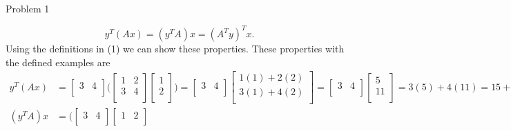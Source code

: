 \begin{problem}{Problem 1}
\begin{highlight}[Solution]
        \begin{equation}
            y^{T}(Ax) = (y^{T}A)x = (A^{T}y)^{T}x.
        \end{equation}
        Using the definitions in (1) we can show these properties. These properties with the defined examples are 
        \begin{align*}
            y^{T}(Ax) & = 
            \begin{bmatrix}
                3 & 4 \\
            \end{bmatrix}
            \Biggl(
                \begin{bmatrix}
                    1 & 2 \\
                    3 & 4 \\
                \end{bmatrix}
                \begin{bmatrix}
                    1 \\
                    2 \\
                \end{bmatrix}
            \Biggr)
            = 
            \begin{bmatrix}
                3 & 4 \\
            \end{bmatrix}
            \begin{bmatrix}
                1(1) + 2(2) \\
                3(1) + 4(2) \\
            \end{bmatrix}
            =
            \begin{bmatrix}
                3 & 4 \\
            \end{bmatrix}
            \begin{bmatrix}
                5 \\
                11 \\
            \end{bmatrix}
            = 3(5) + 4(11) = 15 + 44 = 59 \\
            (y^{T}A)x & = 
            \Biggl(
                \begin{bmatrix}
                    3 & 4 \\
                \end{bmatrix}
                \begin{bmatrix}
                    1 & 2 \\

\end{bmatrix}
\end{align*}
\end{highlight}
\end{problem}
